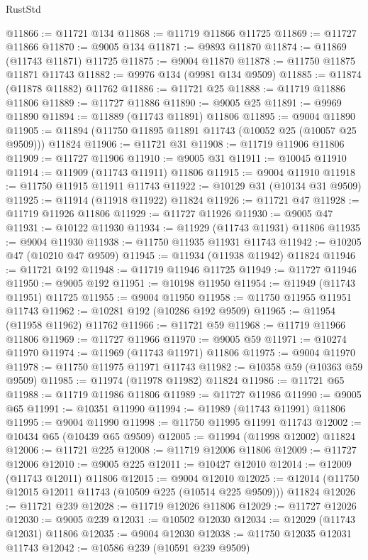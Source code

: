 \begin{lexlean}{RustStd}
\begin{coremodule}
@11866 := @11721 @134
@11868 := @11719 @11866 @11725
@11869 := @11727 @11866
@11870 := @9005 @134
@11871 := @9893 @11870
@11874 := @11869 (@11743 @11871) @11725
@11875 := @9004 @11870
@11878 := @11750 @11875 @11871 @11743
@11882 := @9976 @134 (@9981 @134 @9509)
@11885 := @11874 (@11878 @11882) @11762
@11886 := @11721 @25
@11888 := @11719 @11886 @11806
@11889 := @11727 @11886
@11890 := @9005 @25
@11891 := @9969 @11890
@11894 := @11889 (@11743 @11891) @11806
@11895 := @9004 @11890
@11905 := @11894 (@11750 @11895 @11891 @11743 (@10052 @25 (@10057 @25 @9509))) @11824
@11906 := @11721 @31
@11908 := @11719 @11906 @11806
@11909 := @11727 @11906
@11910 := @9005 @31
@11911 := @10045 @11910
@11914 := @11909 (@11743 @11911) @11806
@11915 := @9004 @11910
@11918 := @11750 @11915 @11911 @11743
@11922 := @10129 @31 (@10134 @31 @9509)
@11925 := @11914 (@11918 @11922) @11824
@11926 := @11721 @47
@11928 := @11719 @11926 @11806
@11929 := @11727 @11926
@11930 := @9005 @47
@11931 := @10122 @11930
@11934 := @11929 (@11743 @11931) @11806
@11935 := @9004 @11930
@11938 := @11750 @11935 @11931 @11743
@11942 := @10205 @47 (@10210 @47 @9509)
@11945 := @11934 (@11938 @11942) @11824
@11946 := @11721 @192
@11948 := @11719 @11946 @11725
@11949 := @11727 @11946
@11950 := @9005 @192
@11951 := @10198 @11950
@11954 := @11949 (@11743 @11951) @11725
@11955 := @9004 @11950
@11958 := @11750 @11955 @11951 @11743
@11962 := @10281 @192 (@10286 @192 @9509)
@11965 := @11954 (@11958 @11962) @11762
@11966 := @11721 @59
@11968 := @11719 @11966 @11806
@11969 := @11727 @11966
@11970 := @9005 @59
@11971 := @10274 @11970
@11974 := @11969 (@11743 @11971) @11806
@11975 := @9004 @11970
@11978 := @11750 @11975 @11971 @11743
@11982 := @10358 @59 (@10363 @59 @9509)
@11985 := @11974 (@11978 @11982) @11824
@11986 := @11721 @65
@11988 := @11719 @11986 @11806
@11989 := @11727 @11986
@11990 := @9005 @65
@11991 := @10351 @11990
@11994 := @11989 (@11743 @11991) @11806
@11995 := @9004 @11990
@11998 := @11750 @11995 @11991 @11743
@12002 := @10434 @65 (@10439 @65 @9509)
@12005 := @11994 (@11998 @12002) @11824
@12006 := @11721 @225
@12008 := @11719 @12006 @11806
@12009 := @11727 @12006
@12010 := @9005 @225
@12011 := @10427 @12010
@12014 := @12009 (@11743 @12011) @11806
@12015 := @9004 @12010
@12025 := @12014 (@11750 @12015 @12011 @11743 (@10509 @225 (@10514 @225 @9509))) @11824
@12026 := @11721 @239
@12028 := @11719 @12026 @11806
@12029 := @11727 @12026
@12030 := @9005 @239
@12031 := @10502 @12030
@12034 := @12029 (@11743 @12031) @11806
@12035 := @9004 @12030
@12038 := @11750 @12035 @12031 @11743
@12042 := @10586 @239 (@10591 @239 @9509)

\end{coremodule}
\end{lexlean}

